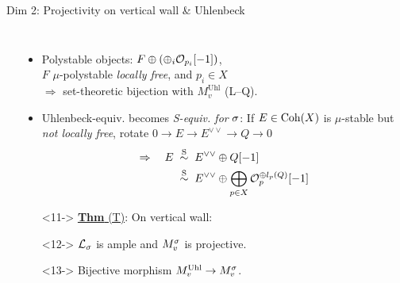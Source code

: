 \documentclass[8pt,handout]{beamer} %
\begin{document}
\begin{frame}[fragile]{Dim 2: Projectivity on vertical wall \& Uhlenbeck}
\begin{columns}[t]
\begin{itemize}
\begin{center}
        \end{center}
        \end{itemize}
                
        \begin{itemize}
            \item<9-> Polystable objects: $F \oplus (\oplus_i \mathcal{O}_{p_i}[-1])$, \\ $F$ $\mu$-polystable \textit{locally free}, and $p_i \in X$ \\ $\Rightarrow$ set-theoretic bijection with $M^{\text{Uhl}}_v$ (L--Q).
            \item<10-> Uhlenbeck-equiv. becomes \textit{S-equiv. for} $\sigma$: If $E \in \mathrm{Coh}(X)$ is $\mu$-stable but \textit{not locally free}, rotate $0 \to E \to E^{\vee\vee} \to Q \to 0$
            \begin{align*}
                \Rightarrow \quad E \; & \overset{\text{S}}{\sim} \; E^{\vee\vee} \oplus Q[-1] \\
                & \overset{\text{S}}{\sim} \; E^{\vee\vee} \oplus \bigoplus_{p \in X} \mathcal{O}_p^{\oplus l_p(Q)}[-1]
            \end{align*} 
            \item[]<11-> \underline{\textbf{Thm} (T)}: On vertical wall:
                \item[]<12-> $\mathcal{L}_\sigma$ is ample and $M^\sigma_v$ is projective.
                \item[]<13-> Bijective morphism $M^{\text{Uhl}}_v \to M^\sigma_v$.
            

\end{itemize}
\end{columns}
\end{frame}
\end{document}
